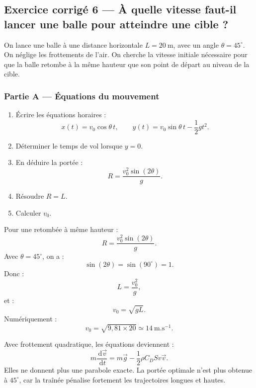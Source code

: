 \documentclass[11pt,a4paper]{article}
\newcommand{\dd}{\,\mathrm d}
\begin{document}
\subsection{Exercice corrigé 6 — À quelle vitesse faut-il lancer une balle pour atteindre une cible ?}

\begin{exercicebox}
On lance une balle à une distance horizontale \(L=20\ \mathrm m\), avec un angle \(\theta=45^\circ\). On néglige les frottements de l'air. On cherche la vitesse initiale nécessaire pour que la balle retombe à la même hauteur que son point de départ au niveau de la cible.
\end{exercicebox}

\subsubsection*{Partie A — Équations du mouvement}

\begin{enumerate}
  \item Écrire les équations horaires :
  \[
  x(t)=v_0\cos\theta\,t,
  \qquad
  y(t)=v_0\sin\theta\,t-\frac12gt^2.
  \]
  \item Déterminer le temps de vol lorsque \(y=0\).
  \item En déduire la portée :
  \[
  R=\frac{v_0^2\sin(2\theta)}{g}.
  \]
  \item Résoudre \(R=L\).
  \item Calculer \(v_0\).
\end{enumerate}

\begin{corrigebox}
Pour une retombée à même hauteur :
\[
R=\frac{v_0^2\sin(2\theta)}{g}.
\]
Avec \(\theta=45^\circ\), on a :
\[
\sin(2\theta)=\sin(90^\circ)=1.
\]
Donc :
\[
L=\frac{v_0^2}{g},
\]
et :
\[
v_0=\sqrt{gL}.
\]
Numériquement :
\[
v_0=\sqrt{9{,}81\times20}\simeq14\ \mathrm{m.s^{-1}}.
\]
\end{corrigebox}

\begin{approfondissementbox}
Avec frottement quadratique, les équations deviennent :
\[
m\frac{\dd \vec v}{\dd t}=m\vec g-\frac12\rho C_DS v\vec v.
\]
Elles ne donnent plus une parabole exacte. La portée optimale n'est plus obtenue à \(45^\circ\), car la traînée pénalise fortement les trajectoires longues et hautes.
\end{approfondissementbox}
\end{document}
